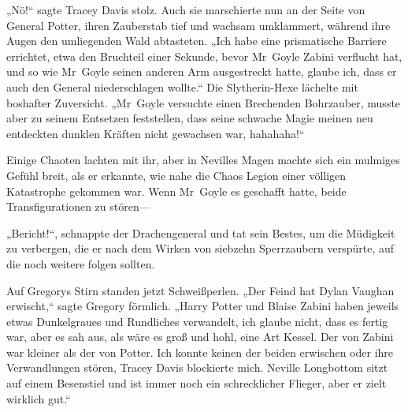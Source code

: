 „Nö!“ sagte Tracey Davis stolz. Auch sie marschierte nun an der Seite von General Potter, ihren Zauberstab tief und wachsam umklammert, während ihre Augen den umliegenden Wald abtasteten. „Ich habe eine prismatische Barriere errichtet, etwa den Bruchteil einer Sekunde, bevor Mr~Goyle Zabini verflucht hat, und so wie Mr~Goyle seinen anderen Arm ausgestreckt hatte, glaube ich, dass er auch den General niederschlagen wollte.“ Die Slytherin-Hexe lächelte mit boshafter Zuversicht. „Mr~Goyle versuchte einen Brechenden Bohrzauber, musste aber zu seinem Entsetzen feststellen, dass seine schwache Magie meinen neu entdeckten dunklen Kräften nicht gewachsen war, hahahaha!“

Einige Chaoten lachten mit ihr, aber in Nevilles Magen machte sich ein mulmiges Gefühl breit, als er erkannte, wie nahe die Chaos Legion einer völligen Katastrophe gekommen war. Wenn Mr~Goyle es geschafft hatte, beide Transfigurationen zu stören—

\later

„Bericht!“, schnappte der Drachengeneral und tat sein Bestes, um die Müdigkeit zu verbergen, die er nach dem Wirken von siebzehn Sperrzaubern verspürte, auf die noch weitere folgen sollten.

Auf Gregorys Stirn standen jetzt Schweißperlen. „Der Feind hat Dylan Vaughan erwischt,“ sagte Gregory förmlich. „Harry Potter und Blaise Zabini haben jeweils etwas Dunkelgraues und Rundliches verwandelt, ich glaube nicht, dass es fertig war, aber es sah aus, als wäre es groß und hohl, eine Art Kessel. Der von Zabini war kleiner als der von Potter. Ich konnte keinen der beiden erwischen oder ihre Verwandlungen stören, Tracey Davis blockierte mich. Neville Longbottom sitzt auf einem Besenstiel und ist immer noch ein schrecklicher Flieger, aber er zielt wirklich gut.“

